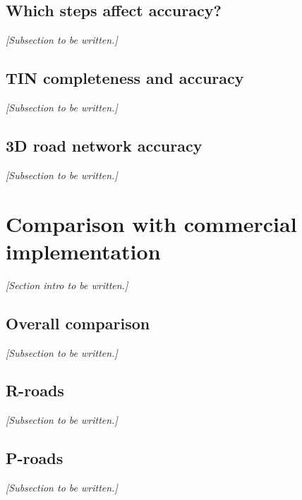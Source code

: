 \subsection{Which steps affect accuracy?}
\label{sub:accuracysteps}

\textit{[Subsection to be written.]}

\subsection{TIN completeness and accuracy}
\label{sub:accuracytin}

\textit{[Subsection to be written.]}

\subsection{3D road network accuracy}
\label{sub:accuracynwb}

\textit{[Subsection to be written.]}

\section{Comparison with commercial implementation}
\label{sec:comparison}

\textit{[Section intro to be written.]}

\subsection{Overall comparison}
\label{sub:comparisonoverall}

\textit{[Subsection to be written.]}

\subsection{R-roads}
\label{sub:comparisonrroads}

\textit{[Subsection to be written.]}

\subsection{P-roads}
\label{sub:comparisonproads}

\textit{[Subsection to be written.]}
